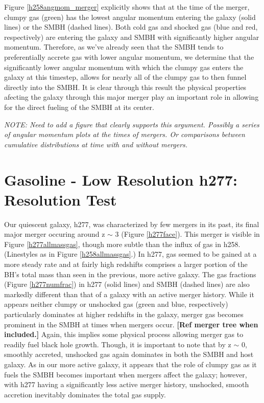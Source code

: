 \documentclass[12pt,headA,chapB]{fiskthesis}
\begin{document}
Figure \ref{h258angmom_merger} explicitly shows that at the time of the merger, clumpy gas (green) has the lowest angular momentum entering the galaxy (solid lines) or the SMBH (dashed lines). Both cold gas and shocked gas (blue and red, respectively) are entering the galaxy and SMBH with significantly higher angular momentum. Therefore, as we've already seen that the SMBH tends to preferentially accrete gas with lower angular momentum, we determine that the significantly lower angular momentum with which the clumpy gas enters the galaxy at this timestep, allows for nearly all of the clumpy gas to then funnel directly into the SMBH. It is clear through this result the physical properties afecting the galaxy through this major merger play an important role in allowing for the direct fueling of the SMBH at its center.

\textit{NOTE: Need to add a figure that clearly supports this argument. Possibly a series of angular momentum plots at the times of mergers. Or comparisons between cumulative distributions at time with and without mergers.}

\section{Gasoline - Low Resolution h277: Resolution Test}
	
Our quiescent galaxy, h277, was characterized by few mergers in its past, its final major merger occuring around z $\sim$ 3 (Figure \ref{h277face}). This merger is visible in Figure \ref{h277allmassgas}, though more subtle than the influx of gas in h258. (Linestyles as in Figure \ref{h258allmassgas}.) In h277, gas seemed to be gained at a more steady rate and at fairly high redshifts comprises a larger portion of the BH's total mass than seen in the previous, more active galaxy. The gas fractions (Figure \ref{h277numfrac}) in h277 (solid lines) and SMBH (dashed lines) are also markedly different than that of a galaxy with an active merger history. While it appears neither clumpy or unshocked gas (green and blue, respectively) particularly dominates at higher redshifts in the galaxy, merger gas becomes prominent in the SMBH at times when mergers occur. \textbf{[Ref merger tree when included.]} Again, this implies some physical process allowing merger gas to readily fuel black hole growth. Though, it is important to note that by z $\sim$ 0, smoothly accreted, unshocked gas again dominates in both the SMBH and host galaxy. As in our more active galaxy, it appears that the role of clumpy gas as it fuels the SMBH becomes important when mergers affect the galaxy; however, with h277 having a significantly less active merger history, unshocked, smooth accretion inevitably dominates the total gas supply.
\end{document}
